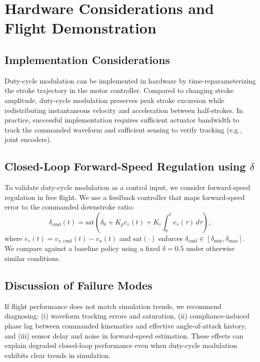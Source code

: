\section{Hardware Considerations and Flight Demonstration}
\subsection{Implementation Considerations}
Duty-cycle modulation can be implemented in hardware by time-reparameterizing the stroke trajectory in the motor controller.
Compared to changing stroke amplitude, duty-cycle modulation preserves peak stroke excursion while redistributing instantaneous velocity and acceleration between half-strokes.
In practice, successful implementation requires sufficient actuator bandwidth to track the commanded waveform and sufficient sensing to verify tracking (e.g., joint encoders).

\subsection{Closed-Loop Forward-Speed Regulation using $\delta$}
To validate duty-cycle modulation as a control input, we consider forward-speed regulation in free flight.
We use a feedback controller that maps forward-speed error to the commanded downstroke ratio:
\begin{equation}
\delta_{\mathrm{cmd}}(t) = \mathrm{sat}\left(\delta_0 + K_p e_v(t) + K_i \int_0^t e_v(\tau)\,d\tau\right),
\end{equation}
where $e_v(t)=v_{x,\mathrm{cmd}}(t)-v_x(t)$ and $\mathrm{sat}(\cdot)$ enforces $\delta_{\mathrm{cmd}}\in[\delta_{\min},\delta_{\max}]$.
We compare against a baseline policy using a fixed $\delta=0.5$ under otherwise similar conditions.

\subsection{Discussion of Failure Modes}
If flight performance does not match simulation trends, we recommend diagnosing: (i) waveform tracking errors and saturation, (ii) compliance-induced phase lag between commanded kinematics and effective angle-of-attack history, and (iii) sensor delay and noise in forward-speed estimation.
These effects can explain degraded closed-loop performance even when duty-cycle modulation exhibits clear trends in simulation.
